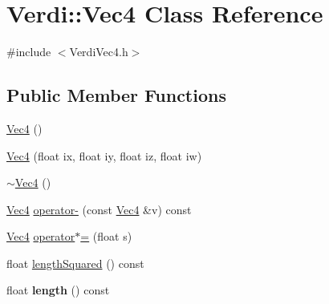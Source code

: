 \hypertarget{class_verdi_1_1_vec4}{\section{\-Verdi\-:\-:\-Vec4 \-Class \-Reference}
\label{class_verdi_1_1_vec4}
}


{\ttfamily \#include $<$\-Verdi\-Vec4.\-h$>$}

\subsection*{\-Public \-Member \-Functions}
\begin{DoxyCompactItemize}
\item 
\hyperlink{class_verdi_1_1_vec4_a9b2dba3be94a527a541a6d500f517904}{\-Vec4} ()
\item 
\hyperlink{class_verdi_1_1_vec4_a71a5d1c5b17c1bb3e41f2922a72a45b8}{\-Vec4} (float ix, float iy, float iz, float iw)
\item 
\hyperlink{class_verdi_1_1_vec4_a831de38462851572df13ed7dcf205dc4}{$\sim$\-Vec4} ()
\item 
\hyperlink{class_verdi_1_1_vec4}{\-Vec4} \hyperlink{class_verdi_1_1_vec4_aa6329a846be84ac9bc31e0fb7fc8e60f}{operator-\/} (const \hyperlink{class_verdi_1_1_vec4}{\-Vec4} \&v) const 
\item 
\hyperlink{class_verdi_1_1_vec4}{\-Vec4} \hyperlink{class_verdi_1_1_vec4_a42818106cc67a22e4ac83bb2d2bd7935}{operator$\ast$=} (float s)
\item 
float \hyperlink{class_verdi_1_1_vec4_aae334b28cde0620fec2b6915e730145b}{length\-Squared} () const 
\item 
\hypertarget{class_verdi_1_1_vec4_aa6c94fa3d13e1a970dee9787d1bf6a75}{float {\bfseries length} () const }\label{class_verdi_1_1_vec4_aa6c94fa3d13e1a970dee9787d1bf6a75}

\end{DoxyCompactItemize}
